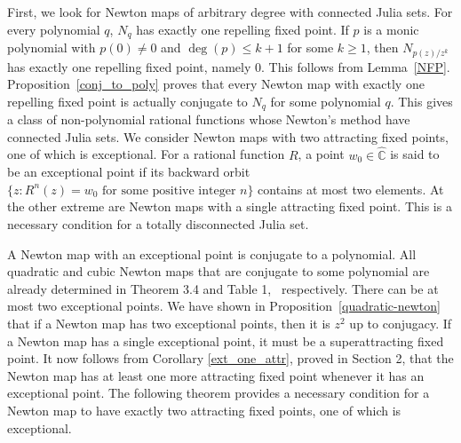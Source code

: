 \documentclass[12pt]{article}
\numberwithin{equation}{section}
\begin{document}
\par 
First, we look for Newton maps of arbitrary degree with connected Julia sets. For every polynomial $q$, $N_q$ has exactly one repelling fixed point. If $p$ is a monic polynomial with $p(0)\neq 0$ and $\deg(p) \leq k+1$ for some $k \geq 1$, then $N_{p(z)/z^k}$ has exactly one repelling fixed point, namely $0$. This follows from Lemma~\ref{NFP}. Proposition~\ref{conj_to_poly} proves that every Newton map with exactly one repelling fixed point is actually conjugate to $N_q$ for some polynomial $q$. This gives a class of non-polynomial rational functions whose Newton's method have connected Julia sets. We consider Newton maps with two attracting fixed points, one of which is exceptional.  
For a rational function $R$, a point $ w_0 \in \widehat{\mathbb{C}} $ is said to be an exceptional point if its backward orbit $ \{ z : R^n(z) = w_0 \text{ for some positive integer } n \}$ contains at most two elements. At the other extreme are Newton maps with a single attracting fixed point. This is a necessary condition for a totally disconnected Julia set. 

\par A Newton map with an exceptional point is conjugate to a polynomial. All quadratic and cubic Newton maps that are conjugate to some polynomial are already determined in Theorem 3.4 and Table 1,~\cite{Nayak_Pal2022} respectively.    
There can be at most two exceptional points. We have shown in Proposition~\ref{quadratic-newton} that if a Newton map has two exceptional points, then it is  $z^2$ up to conjugacy. If a Newton map has a single exceptional point, it must be a superattracting fixed point. It now follows from Corollary \ref{ext_one_attr}, proved in Section 2, that the Newton map has at least one more attracting fixed point whenever it has an exceptional point.
The following theorem provides a necessary condition for a Newton map to have exactly two attracting fixed points, one of which is exceptional.
\end{document}
